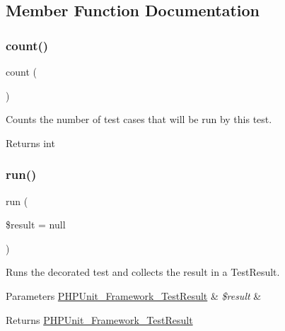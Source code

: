 \subsection{Member Function Documentation}
\mbox{\label{class_p_h_p_unit___extensions___repeated_test_ac751e87b3d4c4bf2feb03bee8b092755}} 
\subsubsection{\texorpdfstring{count()}{count()}}
{\footnotesize\ttfamily count (\begin{DoxyParamCaption}{ }\end{DoxyParamCaption})}

Counts the number of test cases that will be run by this test.

\begin{DoxyReturn}{Returns}
int 
\end{DoxyReturn}
\mbox{\label{class_p_h_p_unit___extensions___repeated_test_aba2e5a83092b40735a7a61c572cd6256}} 
\subsubsection{\texorpdfstring{run()}{run()}}
{\footnotesize\ttfamily run (\begin{DoxyParamCaption}\item[{\mbox{\hyperlink{class_p_h_p_unit___framework___test_result}{P\+H\+P\+Unit\+\_\+\+Framework\+\_\+\+Test\+Result}}}]{\$result = {\ttfamily null} }\end{DoxyParamCaption})}

Runs the decorated test and collects the result in a Test\+Result.


\begin{DoxyParams}[1]{Parameters}
\mbox{\hyperlink{class_p_h_p_unit___framework___test_result}{P\+H\+P\+Unit\+\_\+\+Framework\+\_\+\+Test\+Result}} & {\em \$result} & \\
\hline
\end{DoxyParams}
\begin{DoxyReturn}{Returns}
\mbox{\hyperlink{class_p_h_p_unit___framework___test_result}{P\+H\+P\+Unit\+\_\+\+Framework\+\_\+\+Test\+Result}}
\end{DoxyReturn}

